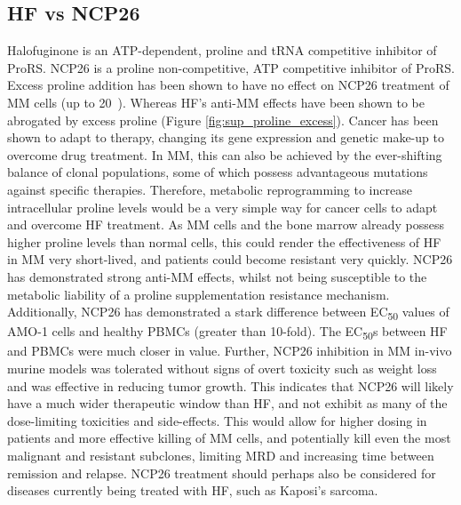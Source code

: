 \subsection{HF vs NCP26}
Halofuginone is an ATP-dependent, proline and tRNA competitive inhibitor of ProRS\@.
NCP26 is a proline non-competitive, ATP competitive inhibitor of ProRS\@.
Excess proline addition has been shown to have no effect on NCP26 treatment of MM cells (up to 20\si{\milli\Molar}).
Whereas HF's anti-MM effects have been shown to be abrogated by excess proline (Figure \ref{fig:sup_proline_excess}).
Cancer has been shown to adapt to therapy, changing its gene expression and genetic make-up to overcome drug treatment.
In MM, this can also be achieved by the ever-shifting balance of clonal populations, some of which possess advantageous mutations against specific therapies.
Therefore, metabolic reprogramming to increase intracellular proline levels would be a very simple way for cancer cells to adapt and overcome HF treatment.
As MM cells and the bone marrow already possess higher proline levels than normal cells, this could render the effectiveness of HF in MM very short-lived, and patients could become resistant very quickly.
NCP26 has demonstrated strong anti-MM effects, whilst not being susceptible to the metabolic liability of a proline supplementation resistance mechanism.
Additionally, NCP26 has demonstrated a stark difference between EC\textsubscript{50} values of AMO-1 cells and healthy PBMCs (greater than 10-fold).
The EC\textsubscript{50}s between HF and PBMCs were much closer in value.
Further, NCP26 inhibition in MM in-vivo murine models was tolerated without signs of overt toxicity such as weight loss and was effective in reducing tumor growth\cite{bottpreclinical2022}.
This indicates that NCP26 will likely have a much wider therapeutic window than HF, and not exhibit as many of the dose-limiting toxicities and side-effects.
This would allow for higher dosing in patients and more effective killing of MM cells, and potentially kill even the most malignant and resistant subclones, limiting MRD and increasing time between remission and relapse.
NCP26 treatment should perhaps also be considered for diseases currently being treated with HF, such as Kaposi's sarcoma.

